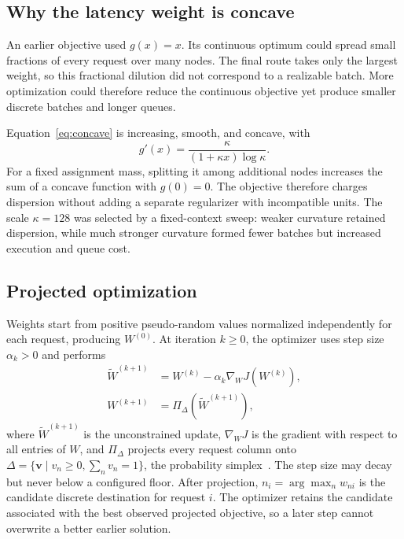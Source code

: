 \documentclass[10pt]{article}
\begin{document}
\subsection{Why the latency weight is concave}

An earlier objective used $g(x)=x$. Its continuous optimum could spread small
fractions of every request over many nodes. The final route takes only the
largest weight, so this fractional dilution did not correspond to a realizable
batch. More optimization could therefore reduce the continuous objective yet
produce smaller discrete batches and longer queues.

Equation~\ref{eq:concave} is increasing, smooth, and concave, with
\begin{equation}
  g'(x)=\frac{\kappa}{(1+\kappa x)\log\kappa}.
\end{equation}
For a fixed assignment mass, splitting it among additional nodes increases
the sum of a concave function with $g(0)=0$. The objective therefore charges
dispersion without adding a separate regularizer with incompatible units.
The scale $\kappa=128$ was selected by a fixed-context sweep: weaker curvature
retained dispersion, while much stronger curvature formed fewer batches but
increased execution and queue cost.

\subsection{Projected optimization}

Weights start from positive pseudo-random values normalized independently for
each request, producing $W^{(0)}$. At iteration $k\geq 0$, the optimizer uses
step size $\alpha_k>0$ and performs
\begin{align}
  \widetilde{W}^{(k+1)}
    &=W^{(k)}-\alpha_k\nabla_W J(W^{(k)}),\\
  W^{(k+1)}
    &=\Pi_{\Delta}\!\left(\widetilde{W}^{(k+1)}\right),
\end{align}
where $\widetilde{W}^{(k+1)}$ is the unconstrained update,
$\nabla_W J$ is the gradient with respect to all entries of $W$, and
$\Pi_{\Delta}$ projects every request column onto
$\Delta=\{\mathbf{v}\mid v_n\geq0,\sum_n v_n=1\}$, the probability
simplex~\cite{projectedsimplex}. The step size may decay but never below a
configured floor. After projection, $n_i=\arg\max_n w_{ni}$ is the candidate
discrete destination for request $i$. The optimizer retains the candidate
associated with the best observed projected objective, so a later step cannot
overwrite a better earlier solution.
\end{document}

